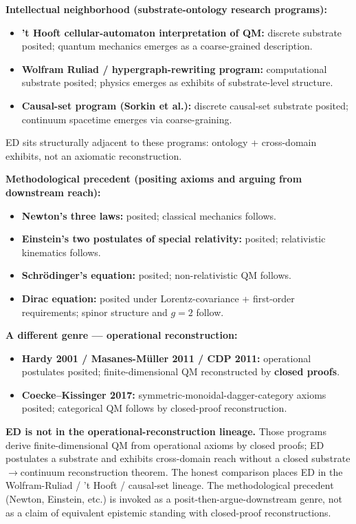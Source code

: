 \documentclass[11pt,a4paper]{article}
\begin{document}
\textbf{Intellectual neighborhood (substrate-ontology research programs):}

\begin{itemize}[noitemsep]
\item \textbf{'t Hooft cellular-automaton interpretation of QM:} discrete substrate posited; quantum mechanics emerges as a coarse-grained description.
\item \textbf{Wolfram Ruliad / hypergraph-rewriting program:} computational substrate posited; physics emerges as exhibits of substrate-level structure.
\item \textbf{Causal-set program (Sorkin et al.):} discrete causal-set substrate posited; continuum spacetime emerges via coarse-graining.
\end{itemize}

ED sits structurally adjacent to these programs: ontology + cross-domain exhibits, not an axiomatic reconstruction.

\textbf{Methodological precedent (positing axioms and arguing from downstream reach):}

\begin{itemize}[noitemsep]
\item \textbf{Newton's three laws:} posited; classical mechanics follows.
\item \textbf{Einstein's two postulates of special relativity:} posited; relativistic kinematics follows.
\item \textbf{Schr\"odinger's equation:} posited; non-relativistic QM follows.
\item \textbf{Dirac equation:} posited under Lorentz-covariance + first-order requirements; spinor structure and $g = 2$ follow.
\end{itemize}

\textbf{A different genre --- operational reconstruction:}

\begin{itemize}[noitemsep]
\item \textbf{Hardy 2001 / Masanes-M\"uller 2011 / CDP 2011:} operational postulates posited; finite-dimensional QM reconstructed by \textbf{closed proofs}.
\item \textbf{Coecke--Kissinger 2017:} symmetric-monoidal-dagger-category axioms posited; categorical QM follows by closed-proof reconstruction.
\end{itemize}

\textbf{ED is not in the operational-reconstruction lineage.} Those programs derive finite-dimensional QM from operational axioms by closed proofs; ED postulates a substrate and exhibits cross-domain reach without a closed substrate$\to$continuum reconstruction theorem. The honest comparison places ED in the Wolfram-Ruliad / 't Hooft / causal-set lineage. The methodological precedent (Newton, Einstein, etc.) is invoked as a posit-then-argue-downstream genre, not as a claim of equivalent epistemic standing with closed-proof reconstructions.
\end{document}
